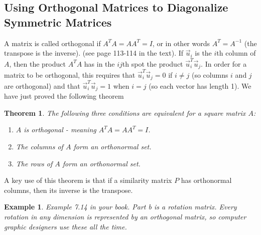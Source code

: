 \documentclass[10pt]{article}
\theoremstyle{plain}
\newtheorem{theorem}{Theorem}\newtheorem*{theorem*}{Theorem}
\theoremstyle{box}
\newtheorem{example}{Example}
\begin{document}
\subsection{Using Orthogonal Matrices to Diagonalize Symmetric Matrices}
A matrix is called orthogonal if $A^TA=AA^T=I$, or in other words $A^T=A^{-1}$ (the transpose is the inverse).  (see page 113-114 in the text). If $\vec u_i$ is the $i$th column of $A$, then the product $A^TA$ has in  the $ij$th spot the product $\vec u_i^T \vec u_j$.  In order for a matrix to be orthogonal, this requires that $\vec u_i^T \vec u_j=0$ if $i\neq j$ (so columns $i$ and $j$ are orthogonal) and that $\vec u_i^T \vec u_j=1$ when $i=j$ (so each vector has length 1).  We have just proved the following theorem
\begin{theorem}
The following three conditions are equivalent for a square matrix $A$:
\begin{enumerate}
	\item $A$ is orthogonal - meaning $A^TA=AA^T=I$.
	\item The columns of $A$ form an orthonormal set.
	\item The rows of $A$ form an orthonormal set.
\end{enumerate}
\end{theorem}
A key use of this theorem is that if a similarity matrix $P$ has orthonormal columns, then its inverse is the transpose.

\begin{example}
Example 7.14 in your book. Part b is a rotation matrix. Every rotation in any dimension is represented by an orthogonal matrix, so computer graphic designers use these all the time.
\end{example}
\end{document}
